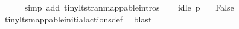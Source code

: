 \begin{isabellebody}
\ \ \ \ \isamarkupfalse%
\ {\isacharparenleft}{\kern0pt}simp\ add{\isacharcolon}{\kern0pt}\ tiny{\isacharunderscore}{\kern0pt}lts{\isachardot}{\kern0pt}tran{\isacharunderscore}{\kern0pt}mappable{\isachardot}{\kern0pt}intros{\isacharparenright}{\kern0pt}\isanewline
\isanewline
\ \ \isamarkupfalse%
\ {\isacartoucheopen}idle\ p{}\ {\isasymemptyset}{\isacartoucheclose}\ \isamarkupfalse%
\ False\ \isanewline
\ \ \ \ \isamarkupfalse%
\ tiny{\isacharunderscore}{\kern0pt}lts{\isacharunderscore}{\kern0pt}mappable{\isachardot}{\kern0pt}initial{\isacharunderscore}{\kern0pt}actions{\isacharunderscore}{\kern0pt}def\ \isamarkupfalse%
\ blast\isanewline
{}\isamarkupfalse%
\isanewline
%
\endisatagvisible
{\isafoldvisible}%
%
\isadelimvisible
%
\endisadelimvisible
%
\isadelimtheory
%
\endisadelimtheory
%
\isatagtheory
%
\endisatagtheory
{\isafoldtheory}%
%
\isadelimtheory
%
\endisadelimtheory
%
\end{isabellebody}%
\endinput
